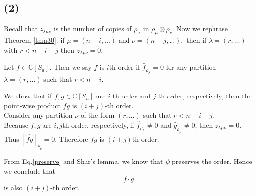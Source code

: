 \documentclass[10pt,reqno]{amsart}
\newcommand{\C}{\mathbb{C}}
\theoremstyle{definition}
\numberwithin{equation}{section}
\begin{document}
\subsection{(2)}
Recall that $z_{\lambda\mu\nu}$
is the number of copies of $\rho_\lambda$
in $\rho_{\mu}\otimes \rho_\nu.$
Now we rephrase Theorem \eqref{thm30}:
if $\mu = (n-i,\ldots)$ and
$\nu = (n-j,\ldots),$
then if $\lambda = (r,\ldots)$
with $r < n-i-j$ then $z_{\lambda\mu\nu} = 0.$

Let $f \in \C[S_n]$. Then we say $f$ is $i$th order if $\hat{f}_{\rho_\lambda} = 0$ for any partition $\lambda = (r, \ldots)$ such that $r < n-i$.

We show that if $f,g \in \C[S_n]$ are $i$-th order and $j$-th order, respectively, then the point-wise product $fg$ is $(i+j)$-th order.\\
Consider any partition $\nu$ of the form $(r, \ldots)$ such that $r < n-i-j$. \\
Because $f,g$ are $i,j$th order, respectively, if $\hat{f}_{\rho_\lambda} \neq 0$ and $\hat{g}_{\rho_\mu} \neq 0$, then $z_{\lambda\mu\nu} = 0$.\\
Thus $[\widehat{fg}]_{\rho_\nu} = 0$. Therefore $fg$ is $(i+j)$th order.

From Eq.\eqref{preserve} and Shur's lemma,
we know that $\psi$ preserves the 
order. Hence we conclude that
\[f\cdot g\]
is also $(i+j)$-th order.

%
%
\end{document}
